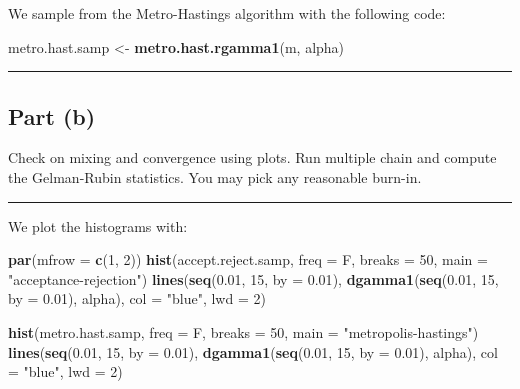 \documentclass[
  11pt,
]{paper}
\newenvironment{Shaded}{\begin{snugshade}}{\end{snugshade}}
\newcommand{\AttributeTok}[1]{\textcolor[rgb]{0.13,0.29,0.53}{#1}}
\newcommand{\DecValTok}[1]{\textcolor[rgb]{0.00,0.00,0.81}{#1}}
\newcommand{\FloatTok}[1]{\textcolor[rgb]{0.00,0.00,0.81}{#1}}
\newcommand{\FunctionTok}[1]{\textcolor[rgb]{0.13,0.29,0.53}{\textbf{#1}}}
\newcommand{\NormalTok}[1]{#1}
\newcommand{\OtherTok}[1]{\textcolor[rgb]{0.56,0.35,0.01}{#1}}
\newcommand{\StringTok}[1]{\textcolor[rgb]{0.31,0.60,0.02}{#1}}
\begin{document}
We sample from the Metro-Hastings algorithm with the following code:

\begin{Shaded}
\begin{Highlighting}[]
\NormalTok{metro.hast.samp }\OtherTok{\textless{}{-}} \FunctionTok{metro.hast.rgamma1}\NormalTok{(m, alpha)}
\end{Highlighting}
\end{Shaded}

\begin{center}\rule{0.5\linewidth}{0.5pt}\end{center}

\hypertarget{part-b}{%
\subsection{Part (b)}\label{part-b}}

Check on mixing and convergence using plots. Run multiple chain and
compute the Gelman-Rubin statistics. You may pick any reasonable
burn-in.

\begin{center}\rule{0.5\linewidth}{0.5pt}\end{center}

We plot the histograms with:

\begin{Shaded}
\begin{Highlighting}[]
\FunctionTok{par}\NormalTok{(}\AttributeTok{mfrow =} \FunctionTok{c}\NormalTok{(}\DecValTok{1}\NormalTok{, }\DecValTok{2}\NormalTok{))}
\FunctionTok{hist}\NormalTok{(accept.reject.samp, }\AttributeTok{freq =}\NormalTok{ F, }\AttributeTok{breaks =} \DecValTok{50}\NormalTok{, }\AttributeTok{main =} \StringTok{"acceptance{-}rejection"}\NormalTok{)}
\FunctionTok{lines}\NormalTok{(}\FunctionTok{seq}\NormalTok{(}\FloatTok{0.01}\NormalTok{, }\DecValTok{15}\NormalTok{, }\AttributeTok{by =} \FloatTok{0.01}\NormalTok{), }\FunctionTok{dgamma1}\NormalTok{(}\FunctionTok{seq}\NormalTok{(}\FloatTok{0.01}\NormalTok{, }\DecValTok{15}\NormalTok{, }\AttributeTok{by =} \FloatTok{0.01}\NormalTok{), alpha), }\AttributeTok{col =} \StringTok{"blue"}\NormalTok{,}
    \AttributeTok{lwd =} \DecValTok{2}\NormalTok{)}

\FunctionTok{hist}\NormalTok{(metro.hast.samp, }\AttributeTok{freq =}\NormalTok{ F, }\AttributeTok{breaks =} \DecValTok{50}\NormalTok{, }\AttributeTok{main =} \StringTok{"metropolis{-}hastings"}\NormalTok{)}
\FunctionTok{lines}\NormalTok{(}\FunctionTok{seq}\NormalTok{(}\FloatTok{0.01}\NormalTok{, }\DecValTok{15}\NormalTok{, }\AttributeTok{by =} \FloatTok{0.01}\NormalTok{), }\FunctionTok{dgamma1}\NormalTok{(}\FunctionTok{seq}\NormalTok{(}\FloatTok{0.01}\NormalTok{, }\DecValTok{15}\NormalTok{, }\AttributeTok{by =} \FloatTok{0.01}\NormalTok{), alpha), }\AttributeTok{col =} \StringTok{"blue"}\NormalTok{,}
    \AttributeTok{lwd =} \DecValTok{2}\NormalTok{)}
\end{Highlighting}
\end{Shaded}
\end{document}
